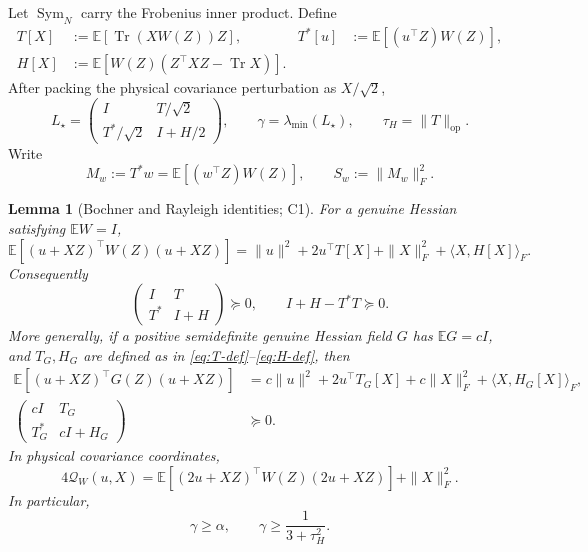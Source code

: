 \documentclass[11pt]{article}
\numberwithin{equation}{section}
\newtheorem{lemma}[theorem]{Lemma}
\DeclareMathOperator{\Tr}{Tr}
\DeclareMathOperator{\Sym}{Sym}
\newcommand{\E}{\mathbb E}
\newcommand{\op}{\mathrm{op}}
\newcommand{\cQ}{\mathcal Q}
\begin{document}
Let $\Sym_N$ carry the Frobenius inner product.  Define
\begin{align}
 T[X]&:=\E[\Tr(XW(Z))Z],
 &T^*[u]&:=\E[(u^\top Z)W(Z)],\label{eq:T-def}\\
 H[X]&:=\E[W(Z)(Z^\top XZ-\Tr X)].\label{eq:H-def}
\end{align}
After packing the physical covariance perturbation as $X/\sqrt2$,
\begin{equation}\label{eq:Lstar}
 L_\star=
 \begin{pmatrix}I&T/\sqrt2\\T^*/\sqrt2&I+H/2\end{pmatrix},
 \qquad
 \gamma=\lambda_{\min}(L_\star),\qquad
 \tau_H=\|T\|_{\op}.
\end{equation}
Write
\begin{equation}\label{eq:M-S}
 M_w:=T^*w=\E[(w^\top Z)W(Z)],\qquad
 S_w:=\|M_w\|_F^2.
\end{equation}

\begin{lemma}[Bochner and Rayleigh identities; C1]\label{lem:bochner}
For a genuine Hessian satisfying $\E W=I$,
\begin{equation}\label{eq:bochner}
 \E[(u+XZ)^\top W(Z)(u+XZ)]
 =\|u\|^2+2u^\top T[X]+\|X\|_F^2+\langle X,H[X]\rangle_F.
\end{equation}
Consequently
\begin{equation}\label{eq:bochner-block}
 \begin{pmatrix}I&T\\T^*&I+H\end{pmatrix}\succeq0,\qquad
 I+H-T^*T\succeq0.
\end{equation}
More generally, if a positive semidefinite genuine Hessian field $G$ has
$\E G=cI$, and $T_G,H_G$ are defined as in
\eqref{eq:T-def}--\eqref{eq:H-def}, then
\begin{align}
 \E[(u+XZ)^\top G(Z)(u+XZ)]
 &=c\|u\|^2+2u^\top T_G[X]+c\|X\|_F^2
   +\langle X,H_G[X]\rangle_F,\label{eq:bochner-general}\\
 \begin{pmatrix}cI&T_G\\T_G^*&cI+H_G\end{pmatrix}&\succeq0.
 \label{eq:bochner-general-block}
\end{align}
In physical covariance coordinates,
\begin{equation}\label{eq:exact-rayleigh}
 4\cQ_W(u,X)=
 \E[(2u+XZ)^\top W(Z)(2u+XZ)]+\|X\|_F^2.
\end{equation}
In particular,
\begin{equation}\label{eq:two-gap-baselines}
 \gamma\ge\alpha,\qquad
 \gamma\ge\frac1{3+\tau_H^2}.
\end{equation}
\end{lemma}
\end{document}
